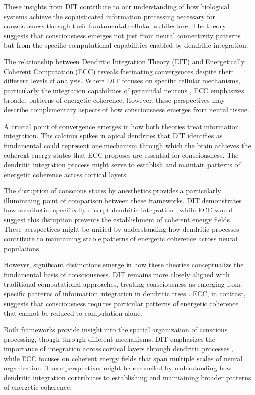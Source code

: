 \begin{refsection}
These insights from DIT contribute to our understanding of how biological systems achieve the sophisticated information processing necessary for consciousness through their fundamental cellular architecture. The theory suggests that consciousness emerges not just from neural connectivity patterns but from the specific computational capabilities enabled by dendritic integration.

The relationship between Dendritic Integration Theory (DIT) and Energetically Coherent Computation (ECC) reveals fascinating convergences despite their different levels of analysis. Where DIT focuses on specific cellular mechanisms, particularly the integration capabilities of pyramidal neurons \cite{Larkum2009}, ECC emphasizes broader patterns of energetic coherence. However, these perspectives may describe complementary aspects of how consciousness emerges from neural tissue.

A crucial point of convergence emerges in how both theories treat information integration. The calcium spikes in apical dendrites that DIT identifies as fundamental \cite{Major2013} could represent one mechanism through which the brain achieves the coherent energy states that ECC proposes are essential for consciousness. The dendritic integration process might serve to establish and maintain patterns of energetic coherence across cortical layers.

The disruption of conscious states by anesthetics provides a particularly illuminating point of comparison between these frameworks. DIT demonstrates how anesthetics specifically disrupt dendritic integration \cite{Suzuki2020}, while ECC would suggest this disruption prevents the establishment of coherent energy fields. These perspectives might be unified by understanding how dendritic processes contribute to maintaining stable patterns of energetic coherence across neural populations.

However, significant distinctions emerge in how these theories conceptualize the fundamental basis of consciousness. DIT remains more closely aligned with traditional computational approaches, treating consciousness as emerging from specific patterns of information integration in dendritic trees \cite{Larkum2013}. ECC, in contrast, suggests that consciousness requires particular patterns of energetic coherence that cannot be reduced to computation alone.

Both frameworks provide insight into the spatial organization of conscious processing, though through different mechanisms. DIT emphasizes the importance of integration across cortical layers through dendritic processes \cite{Phillips2018}, while ECC focuses on coherent energy fields that span multiple scales of neural organization. These perspectives might be reconciled by understanding how dendritic integration contributes to establishing and maintaining broader patterns of energetic coherence.


\end{refsection}
